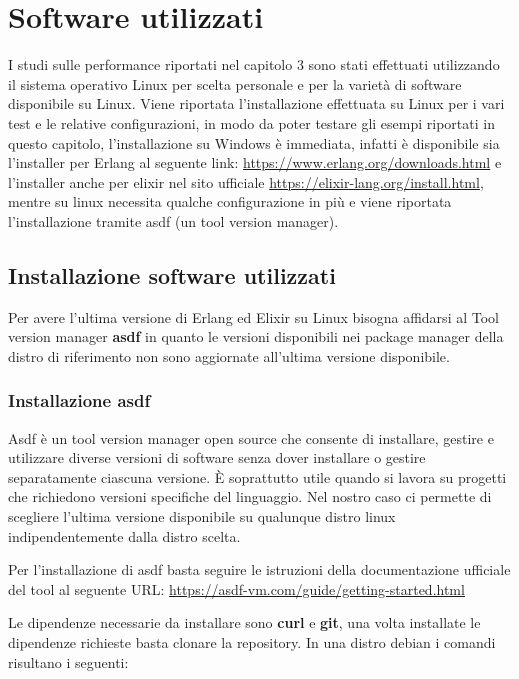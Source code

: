\section{Software utilizzati}

I studi sulle performance riportati nel capitolo 3
sono stati effettuati
utilizzando il sistema operativo Linux per scelta personale e
per la varietà di software disponibile su Linux.
Viene riportata l'installazione effettuata su Linux per i vari test e le
relative configurazioni, in modo da poter testare gli esempi
riportati in questo capitolo, l'installazione su Windows è immediata,
infatti è disponibile sia l'installer per Erlang al seguente link: \url{https://www.erlang.org/downloads.html}
e l'installer anche per elixir nel sito ufficiale \url{https://elixir-lang.org/install.html},
mentre su linux necessita qualche configurazione in più e viene riportata
l'installazione tramite asdf (un tool version manager).

\subsection{Installazione software utilizzati} 

Per avere l'ultima versione di Erlang ed Elixir
su Linux bisogna affidarsi al Tool version manager \textbf{asdf}
in quanto le versioni disponibili nei
package manager della distro di riferimento non sono
aggiornate all'ultima versione disponibile.
\subsubsection{Installazione asdf}

Asdf è un tool version manager open source che consente di installare,
gestire e utilizzare diverse versioni di software senza dover
installare o gestire separatamente ciascuna versione. È soprattutto
utile quando si lavora su progetti che richiedono versioni specifiche
del linguaggio. Nel nostro caso ci permette di scegliere l'ultima
versione disponibile su qualunque distro linux indipendentemente
dalla distro scelta.

Per l'installazione di asdf basta seguire le istruzioni della
documentazione ufficiale del tool al seguente URL: \url{https://asdf-vm.com/guide/getting-started.html}

Le dipendenze necessarie da installare sono \textbf{curl} e \textbf{git},
una volta installate le dipendenze richieste basta clonare la repository.
In una distro debian i comandi risultano i seguenti:

